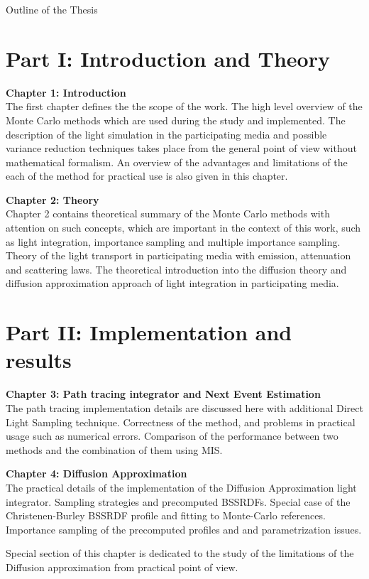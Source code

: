 \newpage

{}

\begin{center}
	\huge{Outline of the Thesis}
\end{center}

\section*{Part I: Introduction and Theory}

\textbf{ Chapter 1: Introduction}\\
The first chapter defines the the scope of the work. The high level overview of the Monte Carlo
methods which are used during the study and implemented.
The description of the light simulation in the participating media and possible variance reduction
techniques takes place from the general point of view without mathematical formalism. An overview of
the advantages and limitations of the each of the method for practical use is also given in this
chapter.

\textbf{Chapter 2: Theory}\\
Chapter 2 contains theoretical summary of the Monte Carlo methods with attention on such concepts,
which are important in the context of this work, such as light integration, importance sampling and
multiple importance sampling.
Theory of the light transport in participating media with emission, attenuation and scattering laws.
The theoretical introduction into the diffusion theory and diffusion approximation approach of light
integration in participating media.

\section*{Part II: Implementation and results}

\textbf{ Chapter 3: Path tracing integrator and Next Event Estimation}\\
The path tracing implementation details are discussed here with additional Direct Light Sampling
technique. Correctness of the method, and problems in practical usage such as numerical errors.
Comparison of the performance between two methods and the combination of them using MIS.

\textbf{ Chapter 4: Diffusion Approximation}\\
The practical details of the implementation of the Diffusion Approximation light integrator.
Sampling strategies and precomputed BSSRDFs. Special case of the Christenen-Burley BSSRDF profile
and fitting to Monte-Carlo references. Importance sampling of the precomputed profiles and and
parametrization issues.

Special section of this chapter is dedicated to the study of the limitations of the Diffusion
approximation from practical point of view.
